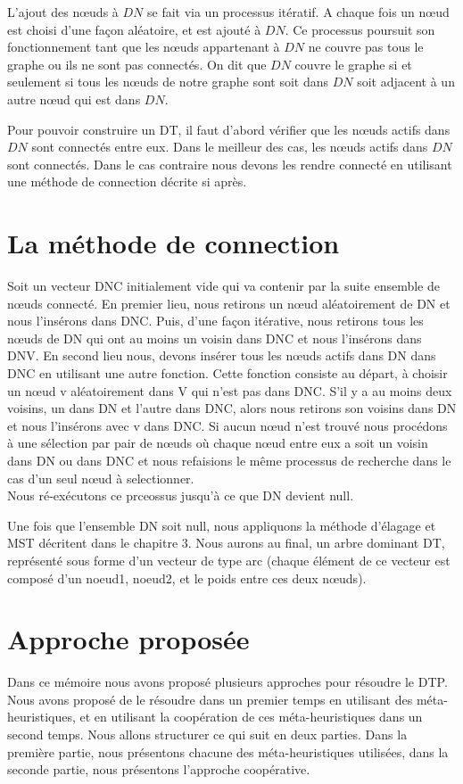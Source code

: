 L’ajout des nœuds à $DN$ se fait via un processus itératif. A chaque fois un nœud est choisi d’une façon aléatoire,  et est ajouté à $DN$. Ce processus poursuit son fonctionnement tant que les nœuds appartenant à $DN$ ne couvre pas tous le graphe ou ils ne sont pas  connectés. On dit que $DN$ couvre le graphe si et seulement si tous les nœuds de notre graphe sont soit dans $DN$ soit adjacent à un autre nœud qui est dans $DN$.

Pour pouvoir construire un DT, il faut d’abord vérifier  que les nœuds actifs dans $DN$  sont connectés entre eux. Dans le meilleur des cas, les nœuds actifs dans $DN$ sont connectés. Dans le cas contraire nous devons les rendre connecté en utilisant une méthode de connection décrite si après.

\section{La méthode de connection}
Soit un vecteur DNC initialement vide qui va contenir par la suite ensemble de nœuds connecté. En premier lieu, nous retirons un nœud aléatoirement de DN et nous l’insérons dans DNC. Puis, d’une façon itérative, nous retirons tous les nœuds de DN qui ont au moins un voisin dans DNC et nous l’insérons dans DNV. En second lieu nous, devons insérer tous les nœuds actifs dans DN dans DNC en utilisant une autre fonction. Cette fonction consiste au départ, à choisir un nœud v aléatoirement dans V qui n’est pas dans DNC. S'il y a au moins deux voisins, un dans DN et l’autre dans DNC, alors nous retirons son voisins dans DN et nous l’insérons  avec v dans DNC. Si aucun nœud n’est trouvé nous procédons à une sélection par pair de nœuds où chaque nœud entre eux a soit un voisin dans DN ou dans DNC et nous refaisions le même processus de recherche dans le cas d’un seul nœud à selectionner.\\
Nous ré-exécutons ce prceossus jusqu'à ce que DN devient null.

Une fois que l’ensemble DN soit null, nous appliquons la méthode d’élagage et MST décritent dans le chapitre 3. Nous aurons au final, un arbre dominant DT, représenté sous forme d’un vecteur de type arc (chaque élément de ce vecteur est composé d’un noeud1, noeud2, et le poids entre ces deux nœuds).



\section{Approche proposée}
Dans ce mémoire nous avons proposé plusieurs approches pour résoudre le DTP. Nous avons proposé de le résoudre dans un premier temps en utilisant des méta-heuristiques, et en utilisant la coopération de ces méta-heuristiques dans un second temps. Nous allons structurer ce qui suit en deux parties. Dans la première partie, nous présentons chacune des méta-heuristiques utilisées, dans la seconde partie, nous présentons l'approche coopérative.


